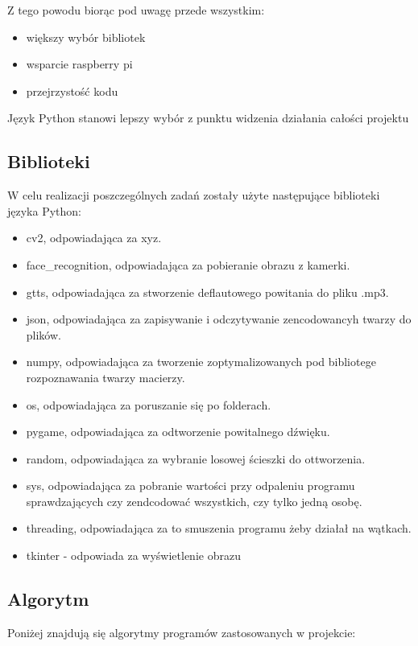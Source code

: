 \documentclass[a4paper,12pt,reqno]{article}
\begin{document}
Z tego powodu biorąc pod uwagę przede wszystkim:
\textcolor{new}{
\begin{itemize}
\item większy wybór bibliotek
\item wsparcie raspberry pi
\item przejrzystość kodu
\end{itemize}
}
Język Python stanowi lepszy wybór z punktu widzenia działania całości projektu
\subsection{Biblioteki}
W celu realizacji poszczególnych zadań zostały użyte następujące biblioteki języka Python:
\textcolor{new}{
\begin{itemize}
\item cv2, odpowiadająca za \textcolor{to_check_at_end}{xyz}.
\item face\_recognition, odpowiadająca za \textcolor{to_check_at_end}{pobieranie obrazu z kamerki}.
\item gtts, odpowiadająca za \textcolor{to_check_at_end}{stworzenie deflautowego powitania do pliku .mp3}.
\item json, odpowiadająca za zapisywanie i odczytywanie zencodowancyh twarzy do plików.
\item numpy, odpowiadająca za \textcolor{to_check_at_end}{tworzenie zoptymalizowanych pod bibliotege rozpoznawania twarzy macierzy}.
\item os, odpowiadająca za poruszanie się po folderach.
\item pygame, odpowiadająca za \textcolor{to_check_at_end}{odtworzenie powitalnego dźwięku}.
\item random, odpowiadająca za \textcolor{to_check_at_end}{wybranie losowej ścieszki do ottworzenia}.
\item sys, odpowiadająca za \textcolor{to_check_at_end}{pobranie wartości przy odpaleniu programu sprawdzających czy zendcodować wszystkich, czy tylko jedną osobę}.
\item \textcolor{to_check_at_end}{threading, odpowiadająca za to smuszenia programu żeby działał na wątkach}.
\item \textcolor{new}{tkinter - odpowiada za wyświetlenie obrazu}
\end{itemize}
}

\newpage
\subsection{Algorytm}
Poniżej znajdują się algorytmy programów zastosowanych w projekcie:
\end{document}
